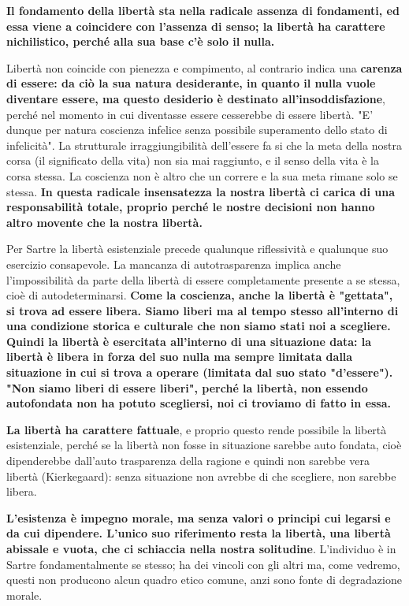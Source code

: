 \textbf{Il fondamento della libertà sta nella radicale
assenza di fondamenti, ed essa viene a coincidere
con l'assenza di senso; la libertà ha
carattere nichilistico, perché alla sua base
c'è solo il nulla.}

Libertà non coincide con pienezza e compimento,
al contrario indica una \textbf{carenza di essere: da ciò
la sua natura desiderante, in quanto il nulla vuole diventare
essere, ma questo desiderio è destinato all'insoddisfazione}, perché nel momento in cui diventasse
essere cesserebbe di essere libertà. "E' dunque
per natura coscienza infelice senza possibile
superamento dello stato di infelicità".
La strutturale irraggiungibilità dell'essere fa si che
la meta della nostra corsa (il significato della vita)
non sia mai raggiunto, e il senso della vita
è la corsa stessa. La coscienza non è altro
che un correre e la sua meta rimane solo se
stessa.
\textbf{In questa radicale insensatezza la nostra libertà
ci carica di una responsabilità totale, proprio
perché le nostre decisioni non hanno altro movente
che la nostra libertà. }

Per Sartre la libertà
esistenziale precede qualunque riflessività e qualunque
suo esercizio consapevole.
La mancanza di autotrasparenza implica anche
l'impossibilità da parte della libertà di essere
completamente presente a se stessa, cioè di
autodeterminarsi. \textbf{Come la coscienza, anche la
libertà è "gettata", si trova ad essere libera.
Siamo liberi ma al tempo stesso all'interno
di una condizione storica e culturale che non
siamo stati noi a scegliere. Quindi la libertà
è esercitata all'interno di una situazione
data: la libertà è libera in forza del suo
nulla ma sempre limitata dalla situazione in
cui si trova a operare (limitata dal suo stato "d'essere").
"Non siamo liberi di essere liberi", perché la
libertà, non essendo autofondata non ha potuto
scegliersi, noi ci troviamo di fatto in essa.}

\textbf{La libertà ha carattere fattuale}, e proprio questo
rende possibile la libertà esistenziale, perché se
la libertà non fosse in situazione sarebbe
auto fondata, cioè dipenderebbe dall'auto trasparenza
della ragione e quindi non sarebbe vera libertà (Kierkegaard): senza situazione non avrebbe di che scegliere, non sarebbe libera.

\textbf{L'esistenza è impegno morale, ma senza valori
o principi cui legarsi e da cui dipendere.
L'unico suo riferimento resta la libertà, una
libertà abissale e vuota, che ci schiaccia nella nostra
solitudine}. L'individuo è in Sartre
fondamentalmente se stesso; ha dei vincoli con gli
altri ma, come vedremo, questi non producono
alcun quadro etico comune, anzi sono fonte
di degradazione morale.

